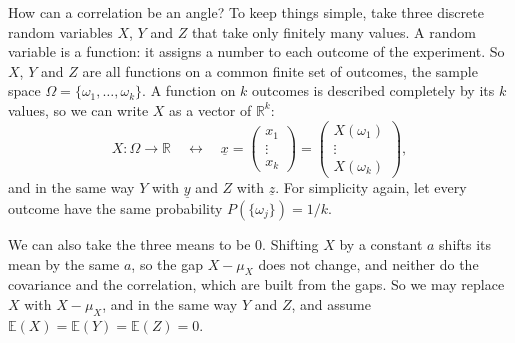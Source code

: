 \documentclass[a4paper,12pt,oneside]{report}
\begin{document}
How can a correlation be an angle? To keep things simple, take three
discrete random variables $X$, $Y$ and $Z$ that take only finitely many
values. A random variable is a function: it assigns a number to each
outcome of the experiment. So $X$, $Y$ and $Z$ are all functions on a
common finite set of outcomes, the sample space
$\Omega=\{\omega_1,\ldots,\omega_k\}$. A function on $k$ outcomes is
described completely by its $k$ values, so we can write $X$ as a vector of
$\mathbb{R}^k$:
\[
X:\Omega\to\mathbb{R}
\quad\longleftrightarrow\quad
\underline{x}=\begin{pmatrix}x_1\\\vdots\\x_k\end{pmatrix}
=\begin{pmatrix}X(\omega_1)\\\vdots\\X(\omega_k)\end{pmatrix},
\]
and in the same way $Y$ with $\underline{y}$ and $Z$ with $\underline{z}$.
For simplicity again, let every outcome have the same probability
$P(\{\omega_j\})=1/k$.

We can also take the three means to be $0$. Shifting $X$ by a constant $a$
shifts its mean by the same $a$, so the gap $X-\mu_X$ does not change, and
neither do the covariance and the correlation, which are built from the
gaps. So we may replace $X$ with $X-\mu_X$, and in the same way $Y$ and $Z$,
and assume $\mathbb{E}(X)=\mathbb{E}(Y)=\mathbb{E}(Z)=0$.
\end{document}
